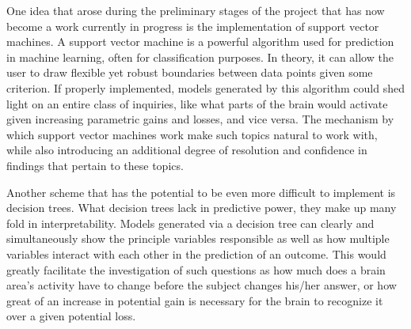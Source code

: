 \par One idea that arose during the preliminary stages of the project that has
now become a work currently in progress is the implementation of support vector
machines. A support vector machine is a powerful algorithm used for prediction
in machine learning, often for classification purposes. In theory, it can allow
the user to draw flexible yet robust boundaries between data points given some
criterion. If properly implemented, models generated by this algorithm could
shed light on an entire class of inquiries, like what parts of the brain would
activate given increasing parametric gains and losses, and vice versa. The
mechanism by which support vector machines work make such topics natural to work
with, while also introducing an additional degree of resolution and confidence
in findings that pertain to these topics.
\par \indent Another scheme that has the potential to be even more difficult to
implement is decision trees. What decision trees lack in predictive power, they
make up many fold in interpretability. Models generated via a decision tree can
clearly and simultaneously show the principle variables responsible as well as
how multiple variables interact with each other in the prediction of an outcome.
This would greatly facilitate the investigation of such questions as how much
does a brain area's activity have to change before the subject changes his/her
answer, or how great of an increase in potential gain is necessary for the brain
to recognize it over a given potential loss.
